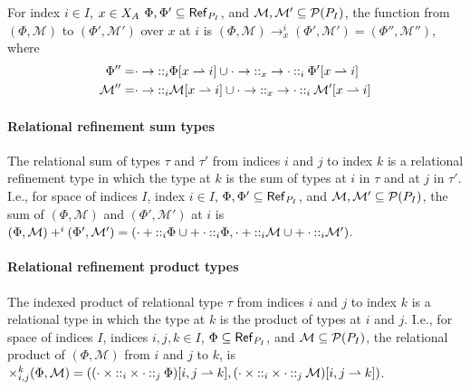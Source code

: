 For index $i \in I$, $x \in X_A$ %
$\Phi, \Phi' \subseteq \mathsf{Ref}_{ P_{I} }$, and %
$\mathcal{M}, \mathcal{M}' \subseteq \mathcal{P}(P_{I})$, the function
from $(\Phi, \mathcal{M})$ to $(\Phi', \mathcal{M}')$ over $x$ at $i$
is
$(\Phi, \mathcal{M}) \to_x^i (\Phi', \mathcal{M}') = (\Phi'',
\mathcal{M}'')$, where
\begin{align*}
  \Phi'' = & \typaramfield \prepend{i} \rename{\Phi}{x}{i} \union %
  \rename{ \typaramfield \prepend{x} \tyresfield \prepend{i} \Phi' }{ x }{ i
  } \\
  \mathcal{M}'' = & \typaramfield \prepend{i} \rename{ \mathcal{M} }{ x }{ i } \union %
                    \rename{ \typaramfield \prepend{x} \tyresfield \prepend{i}
                    \mathcal{M}' }{ x }{ i }
\end{align*}

\paragraph{Relational refinement sum types} The relational sum of
types $\tau$ and $\tau'$ from indices $i$ and $j$ to index $k$ is a
relational refinement type in which the type at $k$ is the sum of
types at $i$ in $\tau$ and at $j$ in $\tau'$.
%
I.e., for space of indices $I$, index $i \in I$,
$\Phi, \Phi' \subseteq \mathsf{Ref}_{ P_{I} }$, and
$\mathcal{M}, \mathcal{M}' \subseteq \mathcal{P}(P_{I})$, the sum of
$(\Phi, \mathcal{M})$ and $(\Phi', \mathcal{M}')$ at $i$ is
$(\Phi, \mathcal{M}) +^i (\Phi', \mathcal{M}') = (\cdot +
\mathbin{::}_{i} \Phi \cup + \cdot \mathbin{::}_{i} \Phi, \cdot +
\mathbin{::}_{i} \mathcal{M} \cup + \cdot \mathbin{::}_{i} \mathcal{M}')$.

\paragraph{Relational refinement product types}
The indexed product of relational type $\tau$ from indices $i$ and $j$
to index $k$ is a relational type in which the type at $k$ is the
product of types at $i$ and $j$.
%
I.e., for space of indices $I$, indices $i, j, k \in I$,
$\Phi \subseteq \mathsf{Ref}_{ P_{I} }$, and
$\mathcal{M} \subseteq \mathcal{P}(P_{I})$, the relational product of
$(\Phi, \mathcal{M})$ from $i$ and $j$ to $k$, is
$\times_{i, j}^k (\Phi, \mathcal{M}) = %
(\rename{ (\tyleftprod \prepend{i} \tyrightprod \prepend{j} \Phi) }{i,
  j}{ k }, %
\rename{ (\tyleftprod \prepend{i} \tyrightprod \prepend{j}
  \mathcal{M}) }{i, j}{ k })$.

